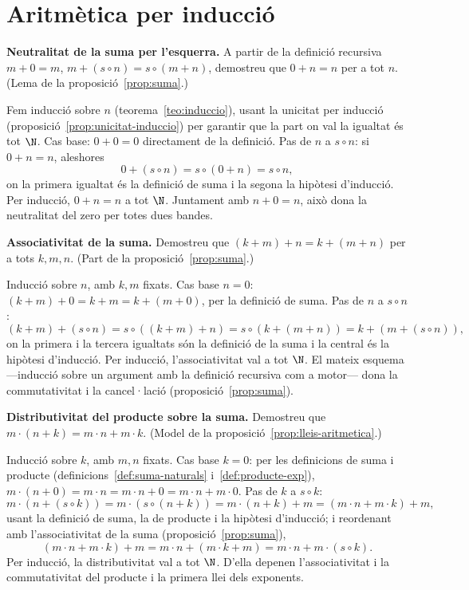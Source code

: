 \section{Aritmètica per inducció}\label{prac:aritmetica}

\begin{exercici}
\textbf{Neutralitat de la suma per l'esquerra.} A partir de la definició recursiva \(m+0=m\), \(m+(s\circ n)=s\circ(m+n)\), demostreu que \(0+n=n\) per a tot \(n\). (Lema de la proposició~\ref{prop:suma}.)
\end{exercici}
\begin{solucio}
Fem inducció sobre \(n\) (teorema~\ref{teo:induccio}), usant la unicitat per inducció (proposició~\ref{prop:unicitat-induccio}) per garantir que la part on val la igualtat és tot \(\N\). Cas base: \(0+0=0\) directament de la definició. Pas de \(n\) a \(s\circ n\): si \(0+n=n\), aleshores
\[
0+(s\circ n)=s\circ(0+n)=s\circ n,
\]
on la primera igualtat és la definició de suma i la segona la hipòtesi d'inducció. Per inducció, \(0+n=n\) a tot \(\N\). Juntament amb \(n+0=n\), això dona la neutralitat del zero per totes dues bandes.
\end{solucio}

\begin{exercici}
\textbf{Associativitat de la suma.} Demostreu que \((k+m)+n=k+(m+n)\) per a tots \(k,m,n\). (Part de la proposició~\ref{prop:suma}.)
\end{exercici}
\begin{solucio}
Inducció sobre \(n\), amb \(k,m\) fixats. Cas base \(n=0\): \((k+m)+0=k+m=k+(m+0)\), per la definició de suma. Pas de \(n\) a \(s\circ n\):
\[
(k+m)+(s\circ n)=s\circ((k+m)+n)=s\circ(k+(m+n))=k+(m+(s\circ n)),
\]
on la primera i la tercera igualtats són la definició de la suma i la central és la hipòtesi d'inducció. Per inducció, l'associativitat val a tot \(\N\). El mateix esquema ---inducció sobre un argument amb la definició recursiva com a motor--- dona la commutativitat i la cancel·lació (proposició~\ref{prop:suma}).
\end{solucio}

\begin{exercici}
\textbf{Distributivitat del producte sobre la suma.} Demostreu que \(m\cdot(n+k)=m\cdot n+m\cdot k\). (Model de la proposició~\ref{prop:lleis-aritmetica}.)
\end{exercici}
\begin{solucio}
Inducció sobre \(k\), amb \(m,n\) fixats. Cas base \(k=0\): per les definicions de suma i producte (definicions~\ref{def:suma-naturals} i~\ref{def:producte-exp}), \(m\cdot(n+0)=m\cdot n=m\cdot n+0=m\cdot n+m\cdot0\). Pas de \(k\) a \(s\circ k\):
\[
m\cdot(n+(s\circ k))=m\cdot(s\circ(n+k))=m\cdot(n+k)+m=(m\cdot n+m\cdot k)+m,
\]
usant la definició de suma, la de producte i la hipòtesi d'inducció; i reordenant amb l'associativitat de la suma (proposició~\ref{prop:suma}),
\[
(m\cdot n+m\cdot k)+m=m\cdot n+(m\cdot k+m)=m\cdot n+m\cdot(s\circ k).
\]
Per inducció, la distributivitat val a tot \(\N\). D'ella depenen l'associativitat i la commutativitat del producte i la primera llei dels exponents.
\end{solucio}


